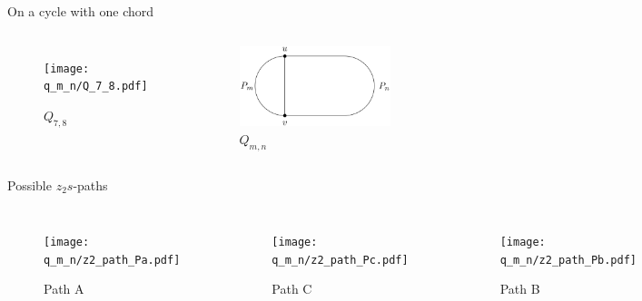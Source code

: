 \begin{frame}{On a cycle with one chord}
  \begin{columns}[onlytextwidth,T]
  \begin{figure}
  \texttt{[image: q\_m\_n/Q\_7\_8.pdf]}
  \caption{$Q_{7,8}$}
  \end{figure}
  \begin{figure}
  \includegraphics[width=0.8\textwidth]{q_m_n/Q_m_n_basic.png}
  \caption{$Q_{m,n}$}
  \end{figure}
  \end{columns}

\end{frame}

\begin{frame}{Possible $z_2s$-paths}
\begin{columns}[onlytextwidth,T]
\begin{figure}
\texttt{[image: q\_m\_n/z2\_path\_Pa.pdf]}
\caption{Path A}
\end{figure}
\begin{figure}
\texttt{[image: q\_m\_n/z2\_path\_Pc.pdf]}
\caption{Path C}
\end{figure}
\begin{figure}
\texttt{[image: q\_m\_n/z2\_path\_Pb.pdf]}
\caption{Path B}
\end{figure}
\begin{figure}
\texttt{[image: q\_m\_n/z2\_path\_Pd.pdf]}
\caption{Path D}
\end{figure}
\end{columns}
\end{frame}
